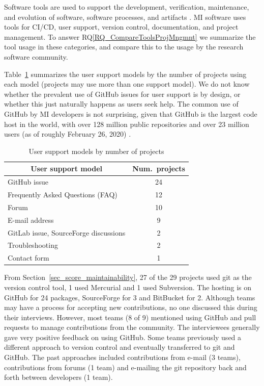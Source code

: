 \documentclass[final, 3p, times, authoryear]{elsarticle}
\newcommand{\rqref}[1]{RQ\ref{#1}}
\begin{document}
Software tools are used to support the development, verification, maintenance,
and evolution of software, software processes, and artifacts \citep[p.\
501]{GhezziEtAl2003}. MI software uses tools for CI/CD, user support, version
control, documentation, and project management.  To answer
\rqref{RQ_CompareToolsProjMngmnt} we summarize the tool usage in these
categories, and compare this to the usage by the research software community.

Table~\ref{tab_user_support_model} summarizes the user support models by the
number of projects using each model (projects may use more than one support
model). We do not know whether the prevalent use of GitHub issues for user
support is by design, or whether this just naturally happens as users seek
help. The common use of GitHub by MI developers is not surprising, given that
GitHub is the largest code host in the world, with over 128 million public
repositories and over 23 million users (as of roughly February 26, 2020)
\citep{Kashyap2020}.

\begin{table}[!ht]
\centering
\begin{tabular}{lc}
\toprule
\multicolumn{1}{c}{User support model} & Num.\ projects \\
\midrule
GitHub issue & 24 \\
Frequently Asked Questions (FAQ) & 12 \\
Forum & 10 \\
E-mail address & 9 \\
GitLab issue, SourceForge discussions & 2 \\
Troubleshooting & 2 \\
Contact form & 1 \\ 
\bottomrule
\end{tabular}
\caption{\label{tab_user_support_model}User support models by number of projects}
\end{table}

From Section~\ref{sec_score_maintainability}, 27 of the 29 projects used git as
the version control tool, 1 used Mercurial and 1 used Subversion.  The hosting
is on GitHub for 24 packages, SourceForge for 3 and BitBucket for 2.  Although
teams may have a process for accepting new contributions, no one discussed this
during their interviews. However, most teams (8 of 9) mentioned using GitHub and
pull requests to manage contributions from the community. The interviewees
generally gave very positive feedback on using GitHub. Some teams previously
used a different approach to version control and eventually transferred to git
and GitHub.  The past approaches included contributions from e-mail (3 teams),
contributions from forums (1 team) and e-mailing the git repository back and
forth between developers (1 team).
\end{document}
